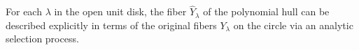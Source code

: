 
For each $\lambda$ in the open unit disk, the fiber $\hat{Y}_\lambda$ of the polynomial hull can be described explicitly in terms of the original fibers $Y_\lambda$ on the circle via an analytic selection process.
